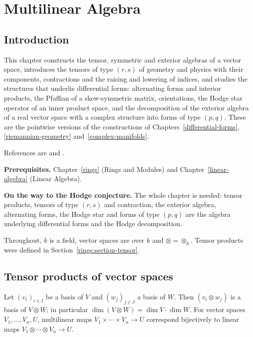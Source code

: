 \chapter{Multilinear Algebra}\label{multilinear-algebra}

\section{Introduction}\label{multilinear-algebra:section-introduction}

This chapter constructs the tensor, symmetric and exterior algebras of a vector space, introduces the
tensors of type $(r,s)$ of geometry and physics with their components, contractions and the raising and
lowering of indices, and studies the structures that underlie differential forms: alternating forms and interior products,
the Pfaffian of a skew-symmetric matrix, orientations, the Hodge star operator of an inner product space, and the decomposition of the
exterior algebra of a real vector space with a complex structure into forms of type $(p,q)$. These are
the pointwise versions of the constructions of Chapters~\ref{differential-forms},
\ref{riemannian-geometry} and~\ref{complex-manifolds}.

References are \cite[Chapters XVI and XIX]{lang-algebra} and \cite{greub-multilinear}.

\noindent\textbf{Prerequisites.} Chapter~\ref{rings} (Rings and Modules) and
Chapter~\ref{linear-algebra} (Linear Algebra).

\noindent\textbf{On the way to the Hodge conjecture.} The whole chapter is needed: tensor products, tensors of type $(r,s)$ and contraction, the exterior algebra, alternating forms, the Hodge star and forms of type $(p,q)$ are the
algebra underlying differential forms and the Hodge decomposition.

Throughout, $k$ is a field, vector spaces are over $k$ and $\otimes = \otimes_k$. Tensor products were
defined in Section~\ref{rings:section-tensor}.

\section{Tensor products of vector spaces}\label{multilinear-algebra:section-tensor-products}

\begin{proposition}\label{multilinear-algebra:proposition-tensor-basis}
Let $(v_i)_{i \in I}$ be a basis of $V$ and $(w_j)_{j \in J}$ a basis of $W$. Then $(v_i \otimes w_j)$ is a basis of
$V \otimes W$; in particular $\dim(V \otimes W) = \dim V \cdot \dim W$. For vector spaces
$V_1, \ldots, V_n, U$, multilinear maps $V_1 \times \cdots \times V_n \to U$ correspond bijectively to linear maps
$V_1 \otimes \cdots \otimes V_n \to U$.
\end{proposition}

